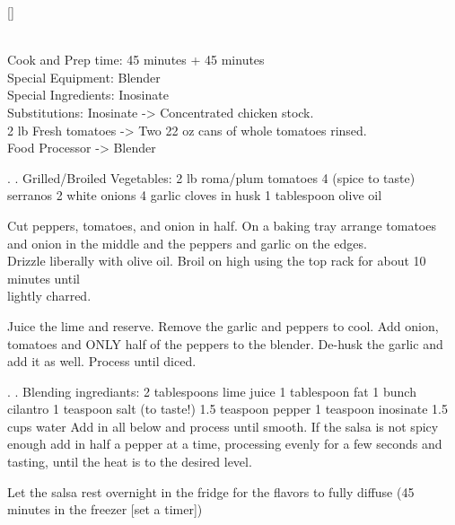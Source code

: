 \documentclass{article}
\makeatletter
\newif\if@mainmatter \@mainmattertrue
\newcommand\frontmatter{%
    \cleardoublepage
  \@mainmatterfalse
  \pagenumbering{roman}}
\newcommand\mainmatter{%
    \cleardoublepage
  \@mainmattertrue
  \pagenumbering{arabic}}
\newcommand{\serves}[2][Serves]{%
    \chead{#1 #2}}
\newcommand{\dishtype}[1]{%
    \rhead{#1}%
}
\newcommand{\dishother}[1]{%
    \lhead{#1}%
}
\newcommand{\vegetarian}{%
    {\large\color{vegcolor}\textbf{V}}%
}
\newcommand{\dessert}{%
    {\large\color{dessertcolor}\textbf{A}}%
}
\newcommand{\appetizer}{%
    {\large\color{appetizercolor}\textbf{A}}%
}
\newcommand{\preptime}[2][Prep time]{%
    \lfoot{#1: #2}%
}
\newcommand{\cooktime}[2][Cook time]{%
    \rfoot{#1: #2}%
}
\makeatother
\begin{document}
\frontmatter
\tableofcontents

\mainmatter

[]
\dishtype{\appetizer}
\dishother{\vegetarian}

\begin{step}
\method
\end{step}
\\
Cook and Prep time: 45 minutes + 45 minutes \\
Special Equipment:  Blender\\
Special Ingredients:  Inosinate\\
Substitutions:  Inosinate -> Concentrated chicken stock. \\
2 lb Fresh tomatoes -> Two 22 oz cans of whole tomatoes rinsed. \\
Food Processor -> Blender 

\begin{step}
. . Grilled/Broiled Vegetables:
2 lb roma/plum tomatoes
4 (spice to taste) serranos
2 white onions 
4 garlic cloves in husk
1 tablespoon olive oil


\method
Cut peppers, tomatoes, and onion in half.
On a baking tray arrange tomatoes and onion in the middle and the peppers and garlic on the edges.
\\
Drizzle liberally with olive oil.
Broil on high using the top rack for about 10 minutes until
\\ lightly charred.

Juice the lime and reserve.
Remove the garlic and peppers to cool. 
Add onion, tomatoes and ONLY half of the peppers to the blender.
De-husk the garlic and add it as well.
Process until diced.
\end{step}

\begin{step}
. . Blending ingrediants:
2 tablespoons lime juice
1 tablespoon fat
1 bunch cilantro
1 teaspoon salt (to taste!)
1.5 teaspoon pepper
1 teaspoon inosinate
1.5 cups water
\method
Add in all below and process until smooth.
If the salsa is not spicy enough add in half a pepper at a time, processing evenly for a few seconds and tasting, until the heat is to the desired level.

Let the salsa rest overnight in the fridge for the flavors to fully diffuse (45 minutes in the freezer [set a timer])
\end{step}
\end{document}
